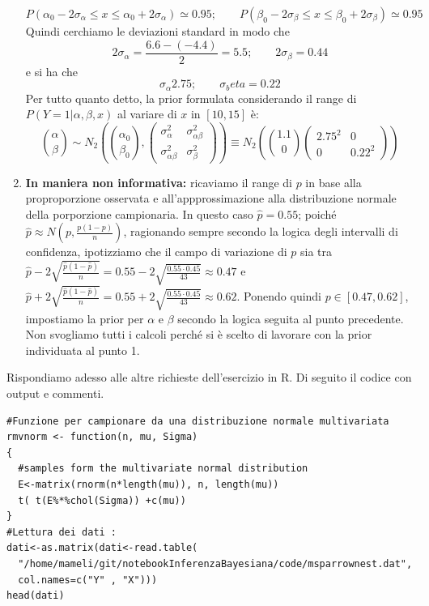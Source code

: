 \begin{enumerate}
   $$P(\alpha_0 - 2\sigma_\alpha \leq x \leq \alpha_0 + 2\sigma_\alpha) \simeq 0.95; \qquad P(\beta_0 - 2\sigma_\beta \leq x \leq \beta_0 + 2\sigma_\beta) \simeq 0.95$$
   Quindi cerchiamo le deviazioni standard in modo che
   $$2\sigma_\alpha =  \frac{6.6 - (-4.4)}{2} = 5.5; \qquad 2\sigma_\beta = 0.44$$
   e si ha che
   $$\sigma_\alpha 2.75; \qquad \sigma_beta = 0.22$$
   Per tutto quanto detto, la prior formulata considerando il range di $P(Y=1 | \alpha, \beta, x)$ al variare di $x$ in $[10, 15]$ è:
   $$\binom{\alpha}{\beta} \sim N_2\left(\binom{\alpha_0}{\beta_0},
   \begin{pmatrix}
    \sigma^2_\alpha & \sigma^2_{\alpha\beta} \\
    \sigma^2_{\alpha\beta} & \sigma^2_\beta

    \end{pmatrix}\right) \equiv N_2 \left(\binom{1.1}{0} \begin{pmatrix} 2.75^2 & 0 \\ 0 & 0.22^2 \end{pmatrix}\right)$$

    \item \textbf{In maniera non informativa:} ricaviamo il range di $p$ in base alla proproporzione osservata e all'appprossimazione alla distribuzione normale della porporzione campionaria. In questo caso $\hat p = 0.55$; poiché $\hat p \approx N(p, \frac{p(1-p)}{n})$, ragionando sempre secondo la logica degli intervalli di confidenza, ipotizziamo che il campo di variazione di $p$ sia tra $\hat p - 2 \sqrt{\frac{\hat p (1-\hat p)}{n}} = 0.55 - 2 \sqrt{\frac{0.55 \cdot 0.45}{43}} \approx 0.47$ e $\hat p + 2 \sqrt{\frac{\hat p (1-\hat p)}{n}} = 0.55 + 2 \sqrt{\frac{0.55 \cdot 0.45}{43}} \approx 0.62$. Ponendo quindi $p \in [0.47, 0.62]$, impostiamo la prior per $\alpha$ e $\beta$ secondo la logica seguita al punto precedente. Non svogliamo tutti i calcoli perché si è scelto di lavorare con la prior individuata al punto 1.
\end{enumerate}
Rispondiamo adesso alle altre richieste dell'esercizio in R. Di seguito il codice con output e commenti.

\begin{lstlisting}[style=R]
#Funzione per campionare da una distribuzione normale multivariata
rmvnorm <- function(n, mu, Sigma)
{
  #samples form the multivariate normal distribution
  E<-matrix(rnorm(n*length(mu)), n, length(mu))
  t( t(E%*%chol(Sigma)) +c(mu))
}
#Lettura dei dati :
dati<-as.matrix(dati<-read.table(
  "/home/mameli/git/notebookInferenzaBayesiana/code/msparrownest.dat", 
  col.names=c("Y" , "X")))
head(dati)
\end{lstlisting}


